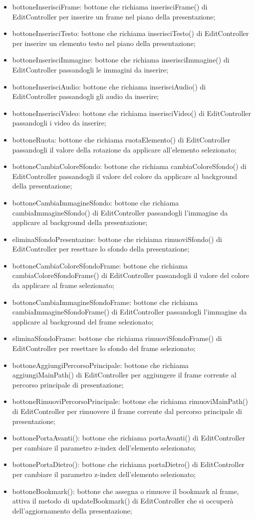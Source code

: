 {{\begin{itemize}
		\item bottoneInserisciFrame: bottone che richiama inserisciFrame() di EditController per inserire un frame nel piano della presentazione;
		\item bottoneInserisciTesto: bottone che richiama inserisciTesto() di EditController per inserire un elemento testo nel piano della presentazione;
		\item bottoneInserisciImmagine: bottone che richiama inserisciImmagine() di EditController passandogli le immagini da inserire;
		\item bottoneInserisciAudio: bottone che richiama inserisciAudio() di EditController passandogli gli audio da inserire;
		\item bottoneInserisciVideo: bottone che richiama inserisciVideo() di EditController passandogli i video da inserire;
		\item bottoneRuota: bottone che richiama ruotaElemento() di EditController passandogli il valore della rotazione da applicare all'elemento selezionato;
		\item bottoneCambiaColoreSfondo: bottone che richiama cambiaColoreSfondo() di EditController passandogli il valore del colore da applicare al background della presentazione;
		\item bottoneCambiaImmagineSfondo: bottone che richiama cambiaImmagineSfondo() di EditController passandogli l'immagine da applicare al background della presentazione;
		\item eliminaSfondoPresentazine: bottone che richiama rimuoviSfondo() di EditController per resettare lo sfondo della presentazione;
		\item bottoneCambiaColoreSfondoFrame: bottone che richiama cambiaColoreSfondoFrame() di EditController passandogli il valore del colore da applicare al frame selezionato;
		\item bottoneCambiaImmagineSfondoFrame: bottone che richiama cambiaImmagineSfondoFrame() di EditController passandogli l'immagine da applicare al background del frame selezionato;
		\item eliminaSfondoFrame: bottone che richiama rimuoviSfondoFrame() di EditController per resettare lo sfondo del frame selezionato;
		\item bottoneAggiungiPercorsoPrincipale: bottone che richiama aggiungiMainPath() di EditController per aggiungere il frame corrente al percorso principale di presentazione;
		\item bottoneRimuoviPercorsoPrincipale: bottone che richiama rimuoviMainPath() di EditController per rimuovere il frame corrente dal percorso principale di presentazione;
		\item bottonePortaAvanti(): bottone che richiama portaAvanti() di EditController per cambiare il parametro z-index dell'elemento selezionato;
		\item bottonePortaDietro(): bottone che richiama portaDietro() di EditController per cambiare il parametro z-index dell'elemento selezionato;
		\item bottoneBookmark(): bottone che assegna o rimuove il bookmark al frame, attiva il metodo di updateBookmark() di EditController che si occuperà dell'aggiornamento della presentazione;


\end{itemize}}}
